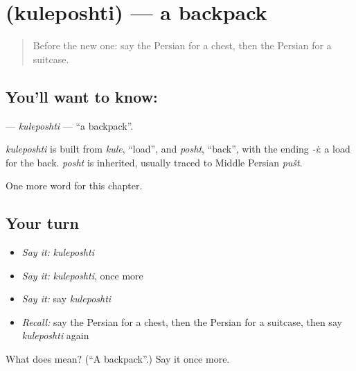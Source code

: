 \section[\texorpdfstring{\fa{کوله} \fa{پشتی} (kuleposhti)}{کوله پشتی (kuleposhti)}]{  (kuleposhti) — a backpack}

\label{lesson:FA-C112-kuleposhti}



\begin{quote}
Before the new one: say the Persian for a chest, then the Persian for a suitcase.
\end{quote}

\subsection*{You'll want to know:  }
\textbf{ } — \emph{kuleposhti} — \textquotedblleft{}a backpack\textquotedblright{}.

\begin{cousinweb}
\emph{kuleposhti} is built from \emph{kule}, \textquotedblleft{}load\textquotedblright{}, and \emph{posht}, \textquotedblleft{}back\textquotedblright{}, with the ending \emph{-i}: a load for the back. \emph{posht} is inherited, usually traced to Middle Persian \emph{pušt}.
\end{cousinweb}

\begin{grammarlens}[title={What you've built}]
One more word for this chapter.
\end{grammarlens}

\subsection*{Your turn}
\begin{itemize}
\raggedright
  \item \emph{Say it:} \emph{kuleposhti}
  \item \emph{Say it:} \emph{kuleposhti}, once more
  \item \emph{Say it:} say \emph{kuleposhti}
  \item \emph{Recall:} say the Persian for a chest, then the Persian for a suitcase, then say \emph{kuleposhti} again
\end{itemize}

\begin{tcolorbox}[breakable,colback=teal!4,colframe=teal!35!black,title={Before you move on}]
What does   mean? (\textquotedblleft{}A backpack\textquotedblright{}.) Say it once more.
\end{tcolorbox}
